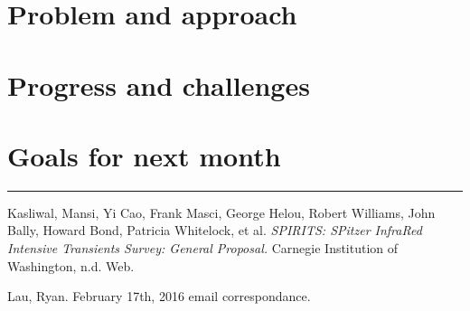 \documentclass{article}
\begin{document}
\section{Problem and approach}


\section{Progress and challenges}


\section{Goals for next month}


\begin{center}
\rule{450pt}{1pt}
\end{center}
\pagebreak
\begin{thebibliography}{9}
	Kasliwal, Mansi, Yi Cao, Frank Masci, George Helou, Robert Williams, John Bally, Howard Bond, Patricia Whitelock, et al. \textit{SPIRITS: SPitzer InfraRed Intensive Transients Survey: General Proposal.} Carnegie Institution of Washington, n.d. Web. 

	Lau, Ryan. February 17th, 2016 email correspondance. 


\end{thebibliography}
\end{document}
